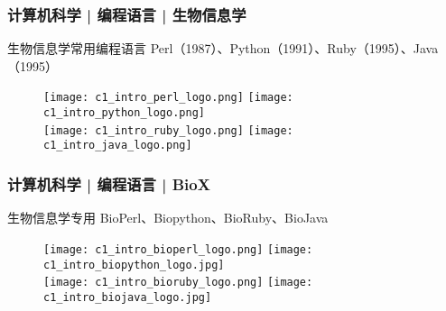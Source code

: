 \begin{frame}
  \frametitle{计算机科学 | 编程语言 | 生物信息学}
  \begin{block}{\alert{生物信息学常用编程语言}}
    Perl（1987）、Python（1991）、Ruby（1995）、Java（1995）
  \end{block}
  \begin{figure}
    \centering
    \texttt{[image: c1\_intro\_perl\_logo.png]}
    \hspace{2em}
    \texttt{[image: c1\_intro\_python\_logo.png]}\\
    \texttt{[image: c1\_intro\_ruby\_logo.png]}
    \hspace{11em}
    \texttt{[image: c1\_intro\_java\_logo.png]}
  \end{figure}
\end{frame}

\begin{frame}
  \frametitle{计算机科学 | 编程语言 | BioX}
  \begin{block}{\alert{生物信息学专用}}
    BioPerl、Biopython、BioRuby、BioJava
  \end{block}
  \begin{figure}
    \centering
    \texttt{[image: c1\_intro\_bioperl\_logo.png]}
    \hspace{2em}
    \texttt{[image: c1\_intro\_biopython\_logo.jpg]}\\
    \texttt{[image: c1\_intro\_bioruby\_logo.png]}
    \hspace{10em}
    \texttt{[image: c1\_intro\_biojava\_logo.jpg]}
  \end{figure}
\end{frame}


